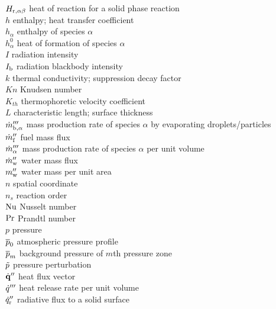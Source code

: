 \begin{tabbing}
$H_{{\rm r},\alpha\beta}$ \> heat of reaction for a solid phase reaction \\
$h$                       \> enthalpy; heat transfer coefficient   \\
$h_\alpha$                \> enthalpy of species $\alpha$   \\
$h_\alpha^0$              \> heat of formation of species $\alpha$   \\
$I$                       \> radiation intensity   \\
$I_{\rm b}$               \> radiation blackbody intensity   \\
$k$                       \> thermal conductivity; suppression decay factor \\
$Kn$                      \> Knudsen number \\
$K_{th}$                  \> thermophoretic velocity coefficient \\
$L$                       \> characteristic length; surface thickness \\
$\dot{m}_{{\rm b},\alpha}'''$ \> mass production rate of species $\alpha$ by evaporating droplets/particles \\
$\dot{m}_{\rm f}''$           \> fuel mass flux \\
$\dot{m}_\alpha'''$           \> mass production rate of species $\alpha$ per unit volume \\
$\dot{m}_{\rm w}''$           \> water mass flux  \\
$m_{\rm w}''$             \> water mass per unit area \\
$n$                       \> spatial coordinate \\
$n_s$                     \> reaction order \\
$\hbox{Nu}$                     \> Nusselt number \\
$\hbox{Pr}$                     \> Prandtl number \\
$p$                       \> pressure \\
$\overline{p}_0$                   \> atmospheric pressure profile \\
$\overline{p}_m$                   \> background pressure of $m$th pressure zone \\
$\tilde{p}$                     \> pressure perturbation \\
$\dot{\bf q}''$                  \> heat flux vector \\
$\dot{q}'''$                  \> heat release rate per unit volume \\
$\dot{q}_{\rm r}''$           \> radiative flux to a solid surface \\

\end{tabbing}
